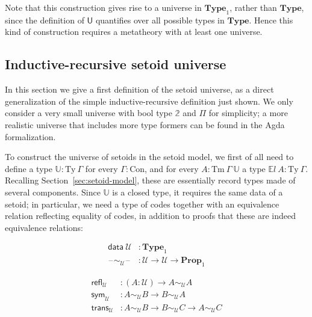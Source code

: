 \documentclass[autoref]{llncs}
\newcommand{\GG}{\Gamma}
\newcommand{\setoidU}{\mathcal{U}}
\newcommand{\mType}{\mathbf{Type}}
\newcommand{\mProp}{\mathbf{Prop}}
\newcommand{\Con}{\mathrm{Con}}
\newcommand{\Ty}{\mathrm{Ty}}
\newcommand{\Tm}{\mathrm{Tm}}
\newcommand{\U}{\textsf{U}}
\newcommand{\Uty}{\mathds{U}}
\newcommand{\equ}[2]{#1 \sim_\setoidU #2}
\providecommand\mathbbm{\mathbb}
\newcommand{\blank}{\mathord{\hspace{1pt}\text{--}\hspace{1pt}}}
\begin{document}
Note that this construction gives rise to a universe in $\mType_1$, rather than
$\mType$, since the definition of $\U$ quantifies over all possible types in
$\mType$. Hence this kind of construction requires a metatheory with at least
one universe.
\vspace{-0.3em}

\subsection{Inductive-recursive setoid universe}\label{ir-setoid-universe}

In this section we give a first definition of the setoid universe, as a direct
generalization of the simple inductive-recursive definition just shown. We only
consider a very small universe with bool type $\mathbbm{2}$ and $\Pi$ for
simplicity; a more realistic universe that includes more type formers
can be found in the Agda formalization.

To construct the universe of setoids in the setoid model, we first of all need
to define a type $\Uty : \Ty\ \GG$ for every $\GG : \Con$, and for every $A :
\Tm\ \GG\ \Uty$ a type $\mathds{E}l\ A : \Ty\ \GG$. Recalling
Section~\ref{sec:setoid-model}, these are essentially record types made of several
components. Since $\Uty$ is a closed type, it requires the same data of a
setoid; in particular, we need a type of codes together with an equivalence
relation reflecting equality of codes, in addition to proofs that these are
indeed equivalence relations:\vspace{-1em} \\
{\small\begin{minipage}{0.4\textwidth}
\vspace{-0.2em}
\begin{align*}
  \textsf{data} \ \setoidU &: \mType_1 \\
  \blank\sim_\setoidU\blank &: \setoidU \to \setoidU \to \mProp_1
\end{align*}
\end{minipage}
\begin{minipage}{0.5\textwidth}
\vspace{-0.2em}
\begin{align*}
  \textsf{refl}_\setoidU &: (A : \setoidU) \to \equ{A}{A} \\
  \textsf{sym}_\setoidU &: \equ{A}{B} \to \equ{B}{A} \\
  \textsf{trans}_\setoidU &: \equ{A}{B} \to \equ{B}{C} \to \equ{A}{C}
\end{align*}
\end{minipage}}\vspace{0.4em}
\end{document}
